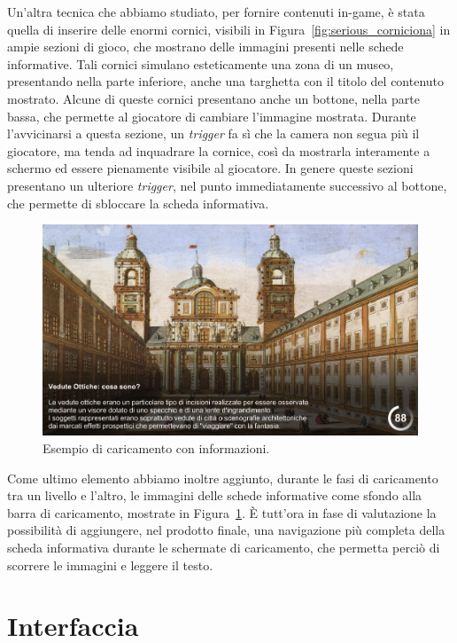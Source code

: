 Un’altra tecnica che abbiamo studiato, per fornire contenuti in-game, è stata quella di inserire delle enormi cornici, visibili in Figura~\ref{fig:serious_corniciona} in ampie sezioni di gioco, che mostrano delle immagini presenti nelle schede informative. Tali cornici simulano esteticamente una zona di un museo, presentando nella parte inferiore, anche una targhetta con il titolo del contenuto mostrato.
Alcune di queste cornici presentano anche un bottone, nella parte bassa, che permette al giocatore di cambiare l’immagine mostrata.
Durante l’avvicinarsi a questa sezione, un \textit{trigger} fa sì che la camera non segua più il giocatore, ma tenda ad inquadrare la cornice, così da mostrarla interamente a schermo ed essere pienamente visibile al giocatore.
In genere queste sezioni presentano un ulteriore \textit{trigger}, nel punto immediatamente successivo al bottone, che permette di sbloccare la scheda informativa.

\begin{figure}%
	\centering
	\includegraphics[width= 0.9\columnwidth]{images/gameDesign/55_caricamenti.jpg}
	\caption{Esempio di caricamento con informazioni.}
	\label{fig:serious_caricamenti}
\end{figure}

Come ultimo elemento abbiamo inoltre aggiunto, durante le fasi di caricamento tra un livello e l’altro, le immagini delle schede informative come sfondo alla barra di caricamento, mostrate in Figura~\ref{fig:serious_caricamenti}.
È tutt’ora in fase di valutazione la possibilità di aggiungere, nel prodotto finale, una navigazione più completa della scheda informativa durante le schermate di caricamento, che permetta perciò di scorrere le immagini e leggere il testo.

\section{Interfaccia}
\label{sec:design_interfaccia}

